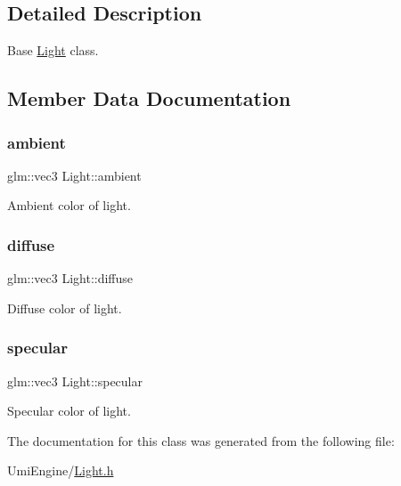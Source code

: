 \subsection{Detailed Description}
Base \mbox{\hyperlink{class_light}{Light}} class. 

\subsection{Member Data Documentation}
\mbox{\label{class_light_afaa34bb2efc167adcb2055359fd08a49}} 
\subsubsection{\texorpdfstring{ambient}{ambient}}
{\footnotesize\ttfamily glm\+::vec3 Light\+::ambient}



Ambient color of light. 

\mbox{\label{class_light_ad47b5347556fd8cd9ebdc60fdfed196b}} 
\subsubsection{\texorpdfstring{diffuse}{diffuse}}
{\footnotesize\ttfamily glm\+::vec3 Light\+::diffuse}



Diffuse color of light. 

\mbox{\label{class_light_aefcfb83a0540ddb885c2622061b28d7e}} 
\subsubsection{\texorpdfstring{specular}{specular}}
{\footnotesize\ttfamily glm\+::vec3 Light\+::specular}



Specular color of light. 



The documentation for this class was generated from the following file\+:\begin{DoxyCompactItemize}
\item 
Umi\+Engine/\mbox{\hyperlink{_light_8h}{Light.\+h}}\end{DoxyCompactItemize}
